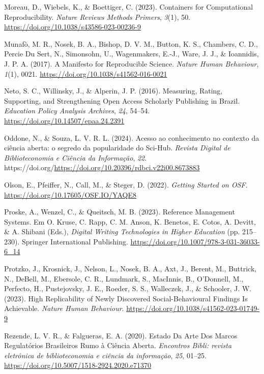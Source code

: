 \documentclass[
  a4paper,
]{book}
\newlength{\cslhangindent}
\newenvironment{CSLReferences}[2] %
 {\begin{list}{}{%
  \setlength{\itemindent}{0pt}
  \setlength{\leftmargin}{0pt}
  \setlength{\parsep}{0pt}
  \ifodd #1
   \setlength{\leftmargin}{\cslhangindent}
   \setlength{\itemindent}{-1\cslhangindent}
  \fi
  \setlength{\itemsep}{#2\baselineskip}}}
 {\end{list}}
\begin{document}
\begin{CSLReferences}{1}{0}
Moreau, D., Wiebels, K., \& Boettiger, C. (2023). Containers for
Computational Reproducibility. \emph{Nature Reviews Methods Primers},
\emph{3}(1), 50. \url{https://doi.org/10.1038/s43586-023-00236-9}

Munafò, M. R., Nosek, B. A., Bishop, D. V. M., Button, K. S., Chambers,
C. D., Percie Du Sert, N., Simonsohn, U., Wagenmakers, E.-J., Ware, J.
J., \& Ioannidis, J. P. A. (2017). A Manifesto for Reproducible Science.
\emph{Nature Human Behaviour}, \emph{1}(1), 0021.
\url{https://doi.org/10.1038/s41562-016-0021}

Neto, S. C., Willinsky, J., \& Alperin, J. P. (2016). Measuring, Rating,
Supporting, and Strengthening Open Access Scholarly Publishing in
{Brazil}. \emph{Education Policy Analysis Archives}, \emph{24}, 54--54.
\url{https://doi.org/10.14507/epaa.24.2391}

Oddone, N., \& Souza, L. V. R. L. (2024). Acesso ao conhecimento no
contexto da ciência aberta: o segredo da popularidade do Sci-Hub.
\emph{Revista Digital de Biblioteconomia e Ciência da Informação},
\emph{22}.
https://doi.org/\url{https://doi.org/10.20396/rdbci.v22i00.8673883}

Olson, E., Pfeiffer, N., Call, M., \& Steger, D. (2022). \emph{Getting
Started on OSF}. \url{https://doi.org/10.17605/OSF.IO/YAQE8}

Proske, A., Wenzel, C., \& Queitsch, M. B. (2023). Reference Management
Systems. Em O. Kruse, C. Rapp, C. M. Anson, K. Benetos, E. Cotos, A.
Devitt, \& A. Shibani (Eds.), \emph{Digital Writing Technologies in
Higher Education} (pp. 215--230). Springer International Publishing.
\url{https://doi.org/10.1007/978-3-031-36033-6_14}

Protzko, J., Krosnick, J., Nelson, L., Nosek, B. A., Axt, J., Berent,
M., Buttrick, N., DeBell, M., Ebersole, C. R., Lundmark, S., MacInnis,
B., O'Donnell, M., Perfecto, H., Pustejovsky, J. E., Roeder, S. S.,
Walleczek, J., \& Schooler, J. W. (2023). High Replicability of Newly
Discovered Social-Behavioural Findings Is Achievable. \emph{Nature Human
Behaviour}. \url{https://doi.org/10.1038/s41562-023-01749-9}

Rezende, L. V. R., \& Falgueras, E. A. (2020). Estado Da Arte Dos Marcos
Regulat{ó}rios Brasileiros Rumo {à} {Ci{ê}ncia Aberta}. \emph{Encontros
Bibli: revista eletr{ô}nica de biblioteconomia e ci{ê}ncia da
informa{ç}{ã}o}, \emph{25}, 01--25.
\url{https://doi.org/10.5007/1518-2924.2020.e71370}


\end{CSLReferences}
\end{document}
